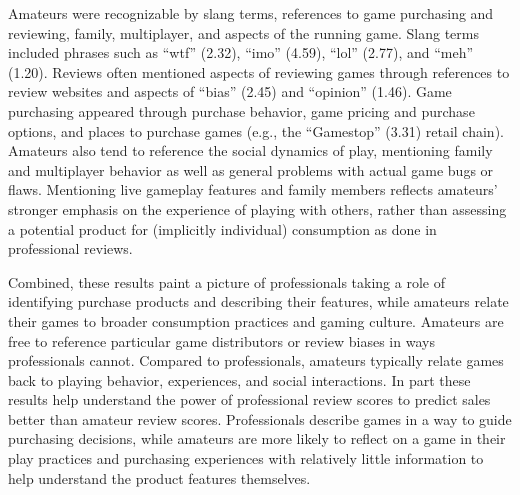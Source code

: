 \documentclass[letterpaper]{article}
\begin{document}
Amateurs were recognizable by slang terms, references to game purchasing and reviewing, family, multiplayer, and aspects of the running game. Slang terms included phrases such as ``wtf'' (2.32), ``imo'' (4.59), ``lol'' (2.77), and ``meh'' (1.20). Reviews often mentioned aspects of reviewing games through references to review websites and aspects of ``bias'' (2.45) and ``opinion'' (1.46). Game purchasing appeared through purchase behavior, game pricing and purchase options, and places to purchase games (e.g., the ``Gamestop'' (3.31) retail chain). Amateurs also tend to reference the social dynamics of play, mentioning family and multiplayer behavior as well as general problems with actual game bugs or flaws. Mentioning live gameplay features and family members reflects amateurs' stronger emphasis on the experience of playing with others, rather than assessing a potential product for (implicitly individual) consumption as done in professional reviews.


Combined, these results paint a picture of professionals taking a role of identifying purchase products and describing their features, while amateurs relate their games to broader consumption practices and gaming culture. Amateurs are free to reference particular game distributors or review biases in ways professionals cannot. Compared to professionals, amateurs typically relate games back to playing behavior, experiences, and social interactions. In part these results help understand the power of professional review scores to predict sales better than amateur review scores. Professionals describe games in a way to guide purchasing decisions, while amateurs are more likely to reflect on a game in their play practices and purchasing experiences with relatively little information to help understand the product features themselves.
\end{document}
